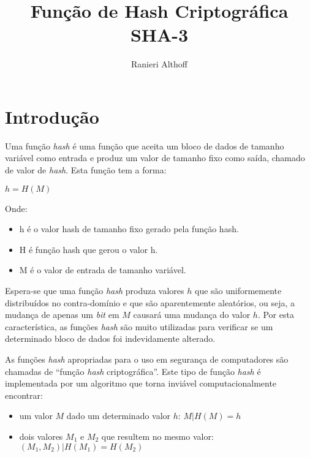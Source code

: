 \documentclass[12pt]{article}
\title{Função de Hash Criptográfica SHA-3}
\author{Ranieri Althoff}
\begin{document}
\maketitle

\section{Introdução}\label{sec:firstpage}

Uma função \textit{hash} é uma função que aceita um bloco de dados de tamanho
variável como entrada e produz um valor de tamanho fixo como saída, chamado de
valor de \textit{hash}. Esta função tem a forma:
\begin{center}
    $h = H(M)$
\end{center}

Onde:
\begin{itemize}
	\item h é o valor hash de tamanho fixo gerado pela função hash.
	\item H é função hash que gerou o valor h.
	\item M é o valor de entrada de tamanho variável.
\end{itemize}

Espera-se que uma função \textit{hash} produza valores $h$ que são
uniformemente distribuídos no contra-domínio e que são aparentemente
aleatórios, ou seja, a mudança de apenas um \textit{bit} em $M$ causará uma
mudança do valor $h$. Por esta característica, as funções \textit{hash} são
muito utilizadas para verificar se um determinado bloco de dados foi
indevidamente alterado.

As funções \textit{hash} apropriadas para o uso em segurança de computadores
são chamadas de ``função \textit{hash} criptográfica''. Este tipo de função
\textit{hash} é implementada por um algoritmo que torna inviável
computacionalmente encontrar:
\begin{itemize}
    \item um valor $M$ dado um determinado valor $h$:
        $M | H(M) = h$
    \item dois valores $M_1$ e $M_2$ que resultem no mesmo valor:
        $(M_1, M_2) | H(M_1) = H(M_2)$
\end{itemize}
\end{document}
